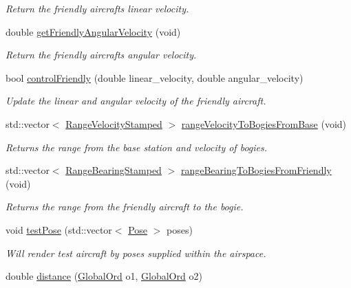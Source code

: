 \begin{DoxyCompactItemize}
\begin{DoxyCompactList}\small\item\em Return the friendly aircraft\textquotesingle{}s linear velocity. \end{DoxyCompactList}\item 
double \hyperlink{classSimulator_a054241a50cbf232b71acdaf4290855d3}{get\+Friendly\+Angular\+Velocity} (void)
\begin{DoxyCompactList}\small\item\em Return the friendly aircraft\textquotesingle{}s angular velocity. \end{DoxyCompactList}\item 
bool \hyperlink{classSimulator_adb1cff57466c3b03fd738036cb9cee63}{control\+Friendly} (double linear\+\_\+velocity, double angular\+\_\+velocity)
\begin{DoxyCompactList}\small\item\em Update the linear and angular velocity of the friendly aircraft. \end{DoxyCompactList}\item 
std\+::vector$<$ \hyperlink{structRangeVelocityStamped}{Range\+Velocity\+Stamped} $>$ \hyperlink{classSimulator_ae286a7571719440cc06b2441900efb44}{range\+Velocity\+To\+Bogies\+From\+Base} (void)
\begin{DoxyCompactList}\small\item\em Returns the range from the base station and velocity of bogies. \end{DoxyCompactList}\item 
std\+::vector$<$ \hyperlink{structRangeBearingStamped}{Range\+Bearing\+Stamped} $>$ \hyperlink{classSimulator_af78c417dd541bf1f671894f49739106f}{range\+Bearing\+To\+Bogies\+From\+Friendly} (void)
\begin{DoxyCompactList}\small\item\em Returns the range from the friendly aircraft to the bogie. \end{DoxyCompactList}\item 
void \hyperlink{classSimulator_aedf306bfd80a13ff07d9197bd5703805}{test\+Pose} (std\+::vector$<$ \hyperlink{structPose}{Pose} $>$ poses)
\begin{DoxyCompactList}\small\item\em Will render test aircraft by poses supplied within the airspace. \end{DoxyCompactList}\item 
double \hyperlink{classSimulator_ab21eff1f7776080c591765f099c2fb7e}{distance} (\hyperlink{structGlobalOrd}{Global\+Ord} o1, \hyperlink{structGlobalOrd}{Global\+Ord} o2)

\end{DoxyCompactItemize}
